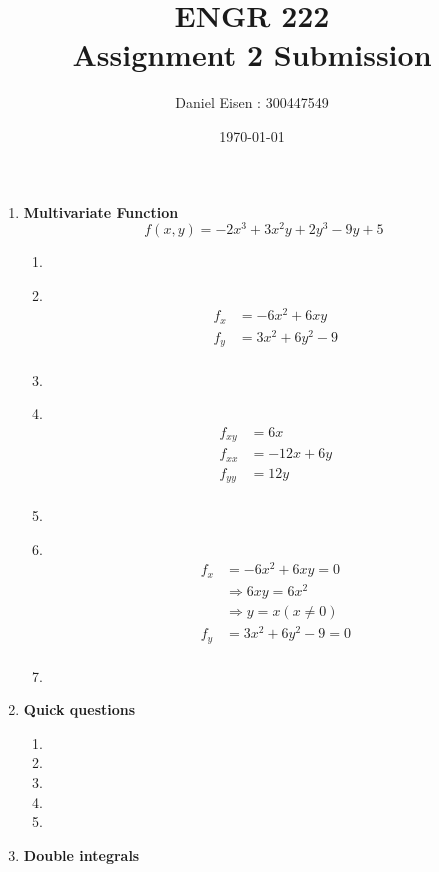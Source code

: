 \documentclass[11pt]{article}
\title{ENGR 222 \\ Assignment 2 Submission}
\author{Daniel Eisen : 300447549}
\date{\today}
\newcommand\Item[1][]{%
  \ifx\relax#1\relax  \item \else \item[#1] \fi
  \abovedisplayskip=0pt\abovedisplayshortskip=0pt~\vspace*{-\baselineskip}}
\begin{document}
\maketitle
\begin{enumerate}
    \item \textbf{Multivariate Function}
          $$f(x,y) = -2x^{3} + 3x^{2}y + 2y^{3} - 9y + 5$$
          \begin{enumerate}
              \Item
              \begin{align*}
                  f_{x} & = -6x^{2} + 6xy       \\
                  f_{y} & = 3x^{2} + 6y^{2} - 9 \\
              \end{align*}
              \Item
              \begin{align*}
                  f_{xy} & = 6x        \\
                  f_{xx} & = -12x + 6y \\
                  f_{yy} & = 12y       \\
              \end{align*}
              \Item
              \begin{align*}
                  f_x &= -6x^{2} + 6xy = 0 \\
                  & \Rightarrow 6xy = 6x^2 \\
                  & \Rightarrow y = x (x \neq 0)\\
                  f_y &= 3x^{2} + 6y^{2} - 9 = 0\\
              \end{align*}
              \item
          \end{enumerate}
    \item \textbf{Quick questions}
          \begin{enumerate}
              \item
              \item
              \item
              \item
              \item
          \end{enumerate}
    \item \textbf{Double integrals}
          \begin{enumerate}

\end{enumerate}
\end{enumerate}
\end{document}
